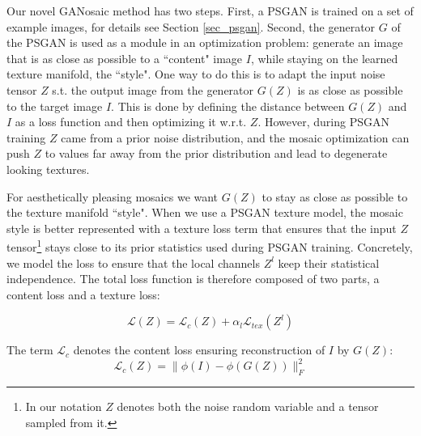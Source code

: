 \documentclass{article}
\begin{document}
Our novel GANosaic method has two steps. First, a PSGAN is trained on a set of example images, for details see Section \ref{sec_psgan}. Second, the generator $G$ of the PSGAN is used as a module in an optimization problem: generate an image that is as close as possible to a ``content" image $I$, while staying on the learned texture manifold, the ``style". 
One way to do this is to adapt the input noise tensor $Z$ s.t. the output image from the generator $G(Z)$ is as close as possible to the target image $I$. This is done by defining the distance between $G(Z)$ and $I$ as a loss function and then optimizing it w.r.t. $Z$. However, during PSGAN training $Z$ came from a prior noise distribution, and the mosaic optimization can push $Z$ to values far away from the prior distribution and lead to degenerate looking textures.



For aesthetically pleasing mosaics we want $G(Z)$ to stay as close as possible to the texture manifold ``style". When we use a PSGAN texture model, the mosaic style is better represented with a texture loss term that ensures that the input $Z$ tensor\footnote{In our notation $Z$ denotes both the noise random variable and a tensor sampled from it.} stays close to its prior statistics used during PSGAN training. 
Concretely, we model the loss to ensure that the local channels $Z^l$ keep their statistical independence.
The total loss function is therefore composed of two parts, a content loss and a texture loss:


\begin{equation}
\mathcal{L}(Z) = \mathcal{L}_{c}(Z)  + \alpha_l   \mathcal{L}_{tex}(Z^l) \label{eq_loss}
\end{equation}

The term $\mathcal{L}_{c}$ denotes the content loss ensuring reconstruction of $I$ by $G(Z)$:
\begin{equation}
\mathcal{L}_{c}(Z) = \|\phi(I) - \phi(G(Z))   \|_F^2
\end{equation}
\end{document}
